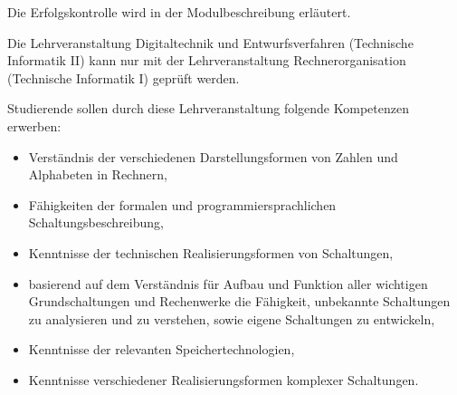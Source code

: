 \begin{course}

\setdoclanguagegerman
{}



\coursehead


\label{cour_7007.dp_997}


\begin{styleenv}
\begin{assessment}
Die Erfolgskontrolle wird in der Modulbeschreibung erläutert.


\end{assessment}

\begin{conditions}Die Lehrveranstaltung Digitaltechnik und Entwurfsverfahren (Technische Informatik II) kann nur mit der Lehrveranstaltung Rechnerorganisation (Technische Informatik I) geprüft werden.

\end{conditions}


\end{styleenv}

\begin{learningoutcomes}
Studierende sollen durch diese Lehrveranstaltung folgende Kompetenzen erwerben:

 \begin{itemize}\item Verständnis der verschiedenen Darstellungsformen von Zahlen und Alphabeten in Rechnern,  \item Fähigkeiten der formalen und programmiersprachlichen Schaltungsbeschreibung,  \item Kenntnisse der technischen Realisierungsformen von Schaltungen,  \item basierend auf dem Verständnis für Aufbau und Funktion aller wichtigen Grundschaltungen und Rechenwerke die Fähigkeit, unbekannte Schaltungen zu analysieren und zu verstehen, sowie eigene Schaltungen zu entwickeln,  \item Kenntnisse der relevanten Speichertechnologien,  \item Kenntnisse verschiedener Realisierungsformen komplexer Schaltungen.  \end{itemize}
\end{learningoutcomes}


\end{course}
